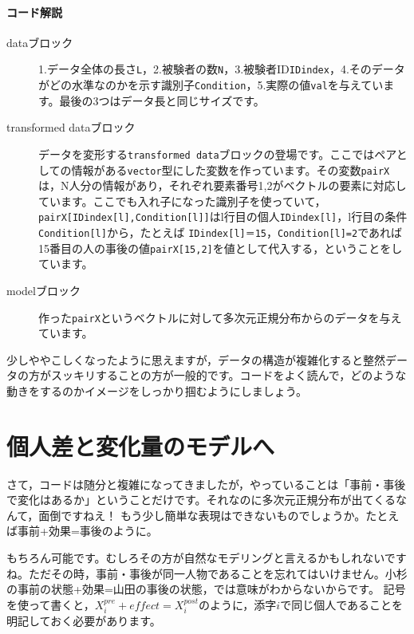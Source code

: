 \documentclass{ltjsbook}
\begin{document}
\paragraph{コード解説}
\begin{description}
	\item[dataブロック] 1.データ全体の長さ\verb|L|，2.被験者の数\verb|N|，3.被験者ID\verb|IDindex|，4.そのデータがどの水準なのかを示す識別子\verb|Condition|，5.実際の値\verb|val|を与えています。最後の3つはデータ長と同じサイズです。
	\item[transformed dataブロック] データを変形する\verb|transformed data|ブロックの登場です。ここではペアとしての情報がある\verb|vector|型にした変数を作っています。その変数\verb|pairX|は，N人分の情報があり，それぞれ要素番号1,2がベクトルの要素に対応しています。ここでも入れ子になった識別子を使っていて，\verb|pairX[IDindex[l],Condition[l]]|はl行目の個人\verb|IDindex[l]|，l行目の条件\verb|Condition[l]|から，たとえば \verb|IDindex[l]＝15|，\verb|Condition[l]=2|であれば15番目の人の事後の値\verb|pairX[15,2]|を値として代入する，ということをしています。
	\item[modelブロック] 作った\verb|pairX|というベクトルに対して多次元正規分布からのデータを与えています。
\end{description}

少しややこしくなったように思えますが，データの構造が複雑化すると整然データの方がスッキリすることの方が一般的です。コードをよく読んで，どのような動きをするのかイメージをしっかり掴むようにしましょう。

\section{個人差と変化量のモデルへ}
さて，コードは随分と複雑になってきましたが，やっていることは「事前・事後で変化はあるか」ということだけです。それなのに多次元正規分布が出てくるなんて，面倒ですねえ！
もう少し簡単な表現はできないものでしょうか。たとえば事前+効果=事後のように。

もちろん可能です。むしろその方が自然なモデリングと言えるかもしれないですね。ただその時，事前・事後が同一人物であることを忘れてはいけません。小杉の事前の状態+効果=山田の事後の状態，では意味がわからないからです。
記号を使って書くと，$X_i^{pre}+effect = X_i^{post}$のように，添字$i$で同じ個人であることを明記しておく必要があります。
\end{document}
